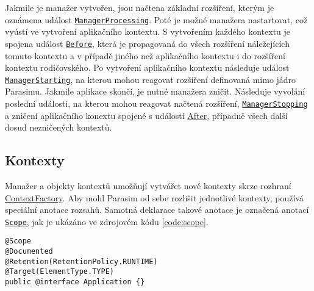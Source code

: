 Jakmile je manažer vytvořen,
jsou načtena zá\-klad\-ní rozšíření, kterým je oznámena událost \href{https://github.com/sybila/parasim/blob/2.0.0.Final/core/src/main/java/org/sybila/parasim/core/event/ManagerProcessing.java}{\texttt{ManagerProcessing}}.
Poté je možné manažera nastartovat, což vyústí ve vytvoření aplikačního kontextu.
S vytvořením každého kontextu je spojena událost \href{https://github.com/sybila/parasim/blob/2.0.0.Final/core/src/main/java/org/sybila/parasim/core/event/Before.java}{\texttt{Before}}, která je propagovaná
do všech roz\-ší\-ře\-ní náležejících tomuto kontextu a v případě jiného než
aplikačního kontextu i do rozšíření kontextu rodičovského.
Po vytvoření aplikačního kontextu následuje událost \href{https://github.com/sybila/parasim/blob/2.0.0.Final/core/src/main/java/org/sybila/parasim/core/event/ManagerStarted.java}{\texttt{ManagerStarting}},
na kterou mohou reagovat rozšíření definovaná mimo jádro Parasimu. Jakmile aplikace skončí,
je nutné ma\-na\-že\-ra zničit. Následuje vyvolání poslední u\-dá\-los\-ti, na kterou mohou reagovat načtená rozšíření, \href{https://github.com/sybila/parasim/blob/2.0.0.Final/core/src/main/java/org/sybila/parasim/core/event/ManagerStopping.java}{\texttt{ManagerStopping}}
a zničení aplikačního konextu spojené s událostí \href{https://github.com/sybila/parasim/blob/2.0.0.Final/core/src/main/java/org/sybila/parasim/core/event/After.java}{After}, případně všech další dosud nezničených kontextů.

\subsection{Kontexty}

Manažer a objekty kontextů umožňují vytvářet nové kontexty skrze rozhraní \href{https://github.com/sybila/parasim/blob/2.0.0.Final/core/src/main/java/org/sybila/parasim/core/api/ContextFactory.java}{ContextFactory}.
Aby mohl Parasim od se\-be rozlišit jednotlivé kontexty, používá speciální anotace
rozsahů. Samotná deklarace takové anotace je označená anotací \href{https://github.com/sybila/parasim/blob/2.0.0.Final/core/src/main/java/org/sybila/parasim/core/annotation/Scope.java}{\texttt{Scope}},
jak je ukázáno ve zdrojovém kódu \ref{code:scope}.

\begin{lstlisting}[label={code:scope}, caption={Anotace rozsahu}, style=Java]
@Scope
@Documented
@Retention(RetentionPolicy.RUNTIME)
@Target(ElementType.TYPE)
public @interface Application {}
\end{lstlisting}

